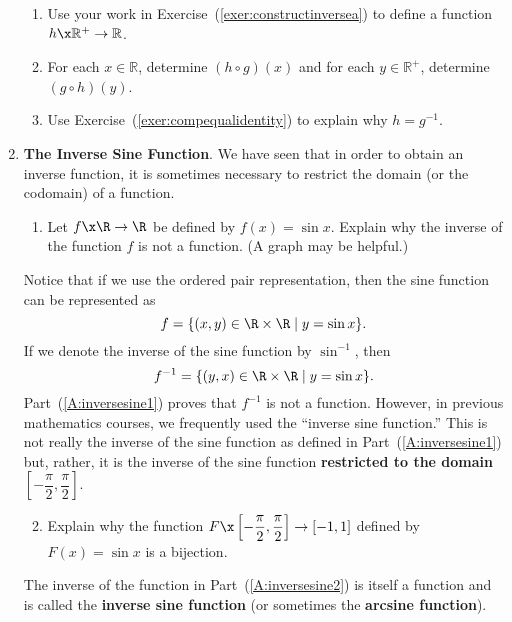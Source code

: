 \begin{enumerate}
\begin{enumerate}
  \item Use your work in Exercise~(\ref{exer:constructinversea}) to define a function   
$h\x \mathbb{R}^ +   \to \mathbb{R}$.

  \item For each  $x \in \mathbb{R}$, determine  $( {h \circ g} )( x )$
and for each  $y \in \mathbb{R}^ +  $, determine  $( {g \circ h} )( y )$.

  \item Use Exercise~(\ref{exer:compequalidentity}) to explain why  $h = g^{ - 1} $.
\end{enumerate}


\item \textbf{The Inverse Sine Function}. \label{A:inversesine} 
We have seen that in order to obtain an inverse function, it is sometimes necessary to restrict the domain (or the codomain) of a function.

\begin{enumerate}
\item Let  $f\x \R \to \R$ be defined by  $f( x ) = \sin x$.  Explain why the inverse of the function  $f$  is not a function.  (A graph may be helpful.)  \label{A:inversesine1}
\end{enumerate}

Notice that if we use the ordered pair representation, then the sine function can be represented as
\[
f  = \left\{ { {( {x, y} ) \in \R \times \R } \mid y = \sin x} \right\}\!.
\]
If we denote the inverse of the sine function by  $\sin ^{ - 1} $, then
\[
f^{ - 1}  = \left\{ { {( {y, x} ) \in \R \times \R } \mid y = \sin x} \right\}\!.
\]
Part~(\ref{A:inversesine1}) proves that  $f^{ - 1} $  is not a function.  However, in previous mathematics courses, we frequently used the ``inverse sine function.''  This is not really the inverse of the sine function as defined in Part~(\ref{A:inversesine1}) but, rather, it is the inverse of the 
sine function \textbf{restricted to the domain}  
$\left[ {-\dfrac{{\pi }}{2}, \dfrac{\pi }{2}} \right]$.

\begin{enumerate}
\setcounter{enumii}{1}
\item Explain why the function  
$F\x \left[ {- \dfrac{{\pi }}{2}, \dfrac{\pi }{2}} \right] \to \left[ { - 1, 1} \right]$
defined by 
$F( x ) = \sin x$ is a bijection.  \label{A:inversesine2}
\end{enumerate}

The inverse of the function in Part~(\ref{A:inversesine2}) is itself a function and is called the \textbf{inverse sine function}
%
 (or sometimes the \textbf{arcsine function}).
%


\end{enumerate}
